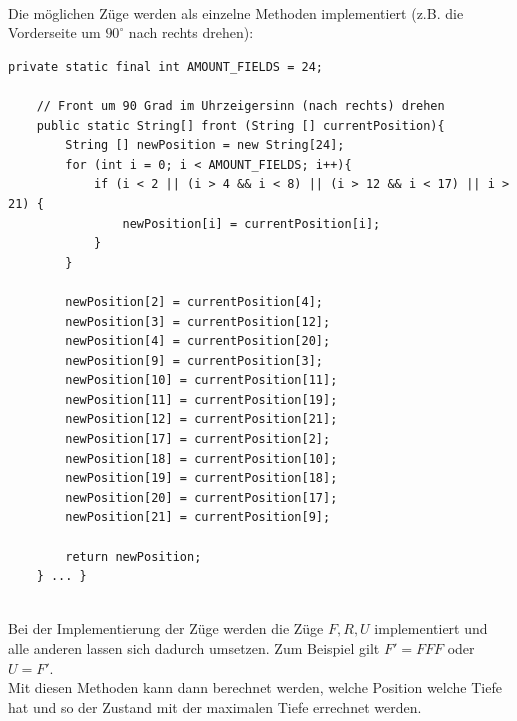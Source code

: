 \documentclass[12pt,a4paper, usenames, dvipsnames]{scrartcl}
\begin{document}
\\
Die möglichen Züge werden als einzelne Methoden implementiert (z.B. die Vorderseite um $90^\circ$ nach rechts drehen):
\begin{verbatim}
private static final int AMOUNT_FIELDS = 24;

    // Front um 90 Grad im Uhrzeigersinn (nach rechts) drehen
    public static String[] front (String [] currentPosition){
        String [] newPosition = new String[24];
        for (int i = 0; i < AMOUNT_FIELDS; i++){
            if (i < 2 || (i > 4 && i < 8) || (i > 12 && i < 17) || i > 21) {
                newPosition[i] = currentPosition[i];
            }
        }

        newPosition[2] = currentPosition[4];
        newPosition[3] = currentPosition[12];
        newPosition[4] = currentPosition[20];
        newPosition[9] = currentPosition[3];
        newPosition[10] = currentPosition[11];
        newPosition[11] = currentPosition[19];
        newPosition[12] = currentPosition[21];
        newPosition[17] = currentPosition[2];
        newPosition[18] = currentPosition[10];
        newPosition[19] = currentPosition[18];
        newPosition[20] = currentPosition[17];
        newPosition[21] = currentPosition[9];

        return newPosition;
    } ... }
\end{verbatim} \\
Bei der Implementierung der Züge werden die Züge $F, R, U$ implementiert und alle anderen lassen sich dadurch umsetzen. Zum Beispiel gilt $F' = FFF$ oder $U=F'$. \\
Mit diesen Methoden kann dann berechnet werden, welche Position welche Tiefe hat und so der Zustand mit der maximalen Tiefe errechnet werden.


\newpage 
\end{document}
